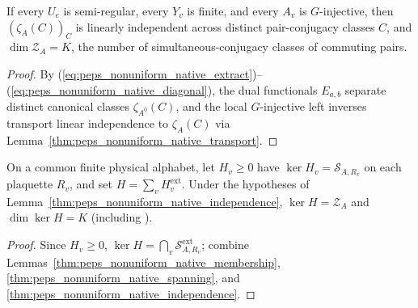 \begin{lemma}%
    \label{thm:peps_nonuniform_native_independence}
    \leanok
    If every $U_e$ is semi-regular, every $Y_v$ is finite, and every $A_v$ is
    $G$-injective, then $(\zeta_A(C))_C$ is linearly independent across
    distinct pair-conjugacy classes $C$, and $\dim\mathcal Z_A=K$, the number
    of simultaneous-conjugacy classes of commuting pairs.
\end{lemma}
\begin{proof}\leanok
    By (\ref{eq:peps_nonuniform_native_extract})--(\ref{eq:peps_nonuniform_native_diagonal}),
    the dual functionals $E_{a,b}$ separate distinct canonical classes
    $\zeta_{A^0}(C)$, and the local $G$-injective left inverses transport linear
    independence to $\zeta_A(C)$ via
    Lemma~\ref{thm:peps_nonuniform_native_transport}.
\end{proof}

\begin{theorem}%
    \label{thm:peps_nonuniform_native_kernel}
    \leanok
    On a common finite physical alphabet, let $H_v\ge0$ have
    $\ker H_v=\mathcal S_{A,R_v}$ on each plaquette $R_v$, and set
    $H=\sum_vH_v^{\mathrm{ext}}$. Under the hypotheses of
    Lemma~\ref{thm:peps_nonuniform_native_independence},
    $\ker H=\mathcal Z_A$ and $\dim\ker H=K$ (including
    \cite[Theorems~5.7 and~5.9]{Schuch2010PEPS}).
\end{theorem}
\begin{proof}\leanok
    Since $H_v\ge0$, $\ker H=\bigcap_v\mathcal S_{A,R_v}^{\mathrm{ext}}$;
    combine Lemmas~\ref{thm:peps_nonuniform_native_membership},
    \ref{thm:peps_nonuniform_native_spanning}, and
    \ref{thm:peps_nonuniform_native_independence}.
\end{proof}


